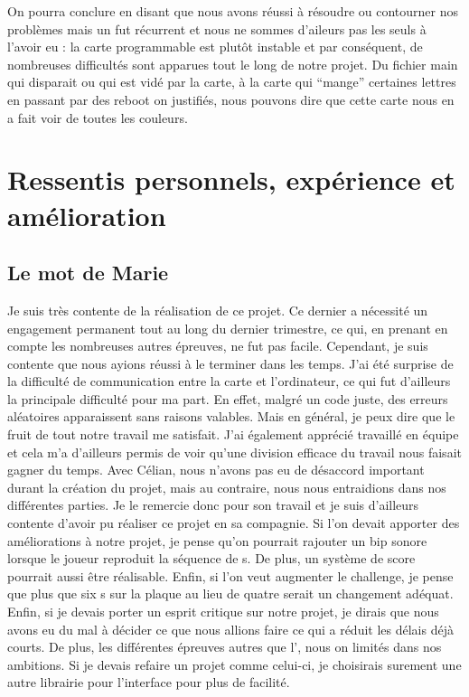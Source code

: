 \documentclass[a4paper, 11pt]{article}
\newcommand{\isn}{\sc{isn}}
\newcommand{\led}{\sc{led}}
\begin{document}
On pourra conclure en disant que nous avons réussi à résoudre ou contourner nos problèmes mais un fut récurrent et nous ne sommes d'aileurs pas les seuls à l'avoir eu : la carte programmable est plutôt instable et par conséquent, de nombreuses difficultés sont apparues tout le long de notre projet. Du fichier main qui disparait ou qui est vidé par la carte, à la carte qui ``mange'' certaines lettres en passant par des reboot on justifiés, nous pouvons dire que cette carte nous en a fait voir de toutes les couleurs.

\section*{Ressentis personnels, expérience et amélioration}

\subsection*{Le mot de Marie}

Je suis très contente de la réalisation de ce projet. Ce dernier a nécessité un engagement permanent tout au long du dernier trimestre, ce qui, en prenant en compte les nombreuses autres épreuves, ne fut pas facile. Cependant, je suis contente que nous ayions réussi à le terminer dans les temps. J'ai été surprise de la difficulté de communication entre la carte et l'ordinateur, ce qui fut d'ailleurs la principale difficulté pour ma part. En effet, malgré un code juste, des erreurs aléatoires apparaissent sans raisons valables. Mais en général, je peux dire que le fruit de tout notre travail me satisfait. J'ai également apprécié travaillé en équipe et cela m'a d'ailleurs permis de voir qu'une division efficace du travail nous faisait gagner du temps. Avec Célian, nous n'avons pas eu de désaccord important durant la création du projet, mais au contraire, nous nous entraidions dans nos différentes parties. Je le remercie donc pour son travail et je suis d'ailleurs contente d'avoir pu réaliser ce projet en sa compagnie.
Si l'on devait apporter des améliorations à notre projet, je pense qu'on pourrait rajouter un bip sonore lorsque le joueur reproduit la séquence de \led{}s. De plus, un système de score pourrait aussi être réalisable. Enfin, si l'on veut augmenter le challenge, je pense que plus que six \led{}s sur la plaque au lieu de quatre serait un changement adéquat.
Enfin, si je devais porter un esprit critique sur notre projet, je dirais que nous avons eu du mal à décider ce que nous allions faire ce qui a réduit les délais déjà courts. De plus, les différentes épreuves autres que l'\isn{}, nous on limités dans nos ambitions. Si je devais refaire un projet comme celui-ci, je choisirais surement une autre librairie pour l'interface pour plus de facilité.
\end{document}
